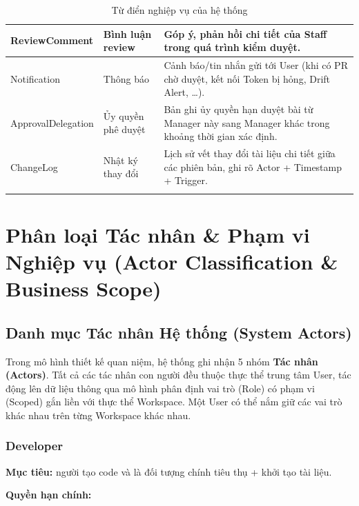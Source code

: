 \begin{longtable}{|p{}|p{}|p{}|}
ReviewComment
&
Bình luận review
&
Góp ý, phản hồi chi tiết của Staff trong quá trình kiểm duyệt.
\\
\hline



Notification
&
Thông báo
&
Cảnh báo/tin nhắn gửi tới User (khi có PR chờ duyệt, kết nối Token bị hỏng, Drift Alert, \ldots).
\\
\hline



ApprovalDelegation
&
Ủy quyền phê duyệt
&
Bản ghi ủy quyền hạn duyệt bài từ Manager này sang Manager khác trong khoảng thời gian xác định.
\\
\hline

ChangeLog
&
Nhật ký thay đổi
&
Lịch sử vết thay đổi tài liệu chi tiết giữa các phiên bản, ghi rõ Actor + Timestamp + Trigger.
\\
\hline



\caption{Từ điển nghiệp vụ của hệ thống}
\label{tab:business-entities}

\end{longtable}



\section{Phân loại Tác nhân \& Phạm vi Nghiệp vụ (Actor Classification \& Business Scope)}
\label{sec:actor-classification}

\subsection{Danh mục Tác nhân Hệ thống (System Actors)}
\label{sec:system-actors}

Trong mô hình thiết kế quan niệm, hệ thống ghi nhận 5 nhóm
\textbf{Tác nhân (Actors)}. Tất cả các tác nhân con người đều thuộc thực
thể trung tâm User, tác động lên dữ liệu thông qua mô hình phân định vai trò
(Role) có phạm vi (Scoped) gắn liền với thực thể Workspace. Một User có thể nắm
giữ các vai trò khác nhau trên từng Workspace khác nhau.

\subsubsection{Developer}

\textbf{Mục tiêu:} người tạo code và là đối tượng chính tiêu thụ +
khởi tạo tài liệu.

\textbf{Quyền hạn chính:}

